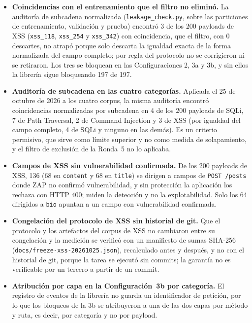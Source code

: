 \begin{itemize}
    derivaron de una taxonomía publicada; la cobertura medida depende de las combinaciones que se
    consideraron válidas.
    \item \textbf{Coincidencias con el entrenamiento que el filtro no eliminó.} La auditoría de
    subcadena normalizada (\texttt{leakage\_check.py}, sobre las particiones de entrenamiento,
    validación y prueba) encontró 3 de los 200 payloads de XSS (\texttt{xss\_118},
    \texttt{xss\_254} y \texttt{xss\_342}) con coincidencia, que el filtro, con 0 descartes, no
    atrapó porque solo descarta la igualdad exacta de la forma normalizada del campo completo; por
    regla del protocolo no se corrigieron ni se retiraron. Los tres se bloquean en las
    Configuraciones 2, 3a y 3b, y sin ellos la librería sigue bloqueando 197 de 197.
    \item \textbf{Auditoría de subcadena en las cuatro categorías.} Aplicada el 25 de octubre de
    2026 a los cuatro corpus, la misma auditoría encontró coincidencias normalizadas por subcadena
    en 4 de los 200 payloads de SQLi, 7 de Path Traversal, 2 de Command Injection y 3 de XSS (por
    igualdad del campo completo, 4 de SQLi y ninguno en las demás). Es un criterio permisivo, que
    sirve como límite superior y no como medida de solapamiento, y el filtro de exclusión de la
    Ronda~5 no lo aplicaba.
    \item \textbf{Campos de XSS sin vulnerabilidad confirmada.} De los 200 payloads de XSS, 136 (68
    en \texttt{content} y 68 en \texttt{title}) se dirigen a campos de \texttt{POST /posts} donde
    ZAP no confirmó vulnerabilidad, y sin protección la aplicación los rechaza con HTTP 400; miden
    la detección y no la explotabilidad. Solo los 64 dirigidos a \texttt{bio} apuntan a un campo
    con vulnerabilidad confirmada.
    \item \textbf{Congelación del protocolo de XSS sin historial de git.} Que el protocolo y los
    artefactos del corpus de XSS no cambiaron entre su congelación y la medición se verificó con un
    manifiesto de sumas SHA-256 (\texttt{docs/freeze-xss-20261025.json}), recalculado antes y
    después, y no con el historial de git, porque la tarea se ejecutó sin commits; la garantía no
    es verificable por un tercero a partir de un commit.
    \item \textbf{Atribución por capa en la Configuración~3b por categoría.} El registro de eventos
    de la librería no guarda un identificador de petición, por lo que los bloqueos de la 3b se
    atribuyeron a una de las dos capas por método y ruta, es decir, por categoría y no por payload.

\end{itemize}
